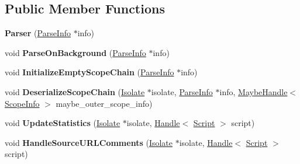 \subsection*{Public Member Functions}
\begin{DoxyCompactItemize}
\item 
\mbox{\label{classv8_1_1internal_1_1Parser_a381ef18980cfd4edc5a94320f3ffdb56}} 
{\bfseries Parser} (\mbox{\hyperlink{classv8_1_1internal_1_1ParseInfo}{Parse\+Info}} $\ast$info)
\item 
\mbox{\label{classv8_1_1internal_1_1Parser_a52beadf837b1240bdfd58b814082b96d}} 
void {\bfseries Parse\+On\+Background} (\mbox{\hyperlink{classv8_1_1internal_1_1ParseInfo}{Parse\+Info}} $\ast$info)
\item 
\mbox{\label{classv8_1_1internal_1_1Parser_a35cf1751f956acca6fc1db2f6290c204}} 
void {\bfseries Initialize\+Empty\+Scope\+Chain} (\mbox{\hyperlink{classv8_1_1internal_1_1ParseInfo}{Parse\+Info}} $\ast$info)
\item 
\mbox{\label{classv8_1_1internal_1_1Parser_a6ab89cd0a4c61a2f459f353eaef183c2}} 
void {\bfseries Deserialize\+Scope\+Chain} (\mbox{\hyperlink{classv8_1_1internal_1_1Isolate}{Isolate}} $\ast$isolate, \mbox{\hyperlink{classv8_1_1internal_1_1ParseInfo}{Parse\+Info}} $\ast$info, \mbox{\hyperlink{classv8_1_1internal_1_1MaybeHandle}{Maybe\+Handle}}$<$ \mbox{\hyperlink{classv8_1_1internal_1_1ScopeInfo}{Scope\+Info}} $>$ maybe\+\_\+outer\+\_\+scope\+\_\+info)
\item 
\mbox{\label{classv8_1_1internal_1_1Parser_a83c18db5b20691f8324713a239f8d975}} 
void {\bfseries Update\+Statistics} (\mbox{\hyperlink{classv8_1_1internal_1_1Isolate}{Isolate}} $\ast$isolate, \mbox{\hyperlink{classv8_1_1internal_1_1Handle}{Handle}}$<$ \mbox{\hyperlink{classv8_1_1internal_1_1Script}{Script}} $>$ script)
\item 
\mbox{\label{classv8_1_1internal_1_1Parser_ae26011456d1b1a5cc4e2f70f1d5396b6}} 
void {\bfseries Handle\+Source\+U\+R\+L\+Comments} (\mbox{\hyperlink{classv8_1_1internal_1_1Isolate}{Isolate}} $\ast$isolate, \mbox{\hyperlink{classv8_1_1internal_1_1Handle}{Handle}}$<$ \mbox{\hyperlink{classv8_1_1internal_1_1Script}{Script}} $>$ script)
\end{DoxyCompactItemize}
